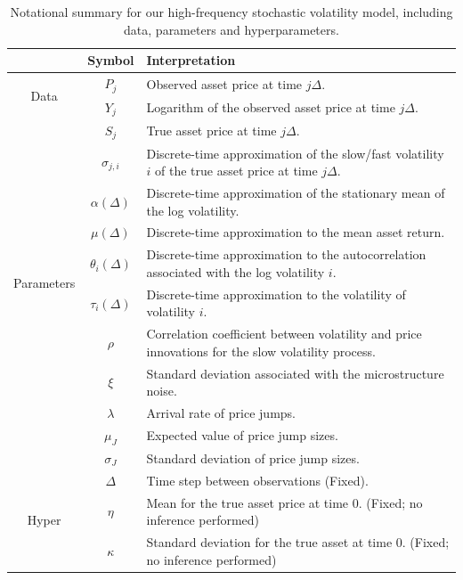 \documentclass[10pt]{article}
\begin{document}
\begin{table}[h!]
\begin{center}
\begin{tabular}{c|c|p{10cm}}
&  Symbol   &   Interpretation  \\ \hline \hline
\multirow{2}{*}{\begin{sideways} Data \end{sideways}} &  $P_j$   &   Observed asset price at time $j\Delta$.  \\
&  $Y_j$   &   Logarithm of the observed asset price at time $j\Delta$.  \\ \hline
\multirow{10}{*}{\begin{sideways} Parameters \end{sideways}} &  $S_j$   &   True asset price at time $j\Delta$.  \\
&  $\sigma_{j,i}$   &   Discrete-time approximation of the slow/fast volatility $i$ of the true asset price at time $j\Delta$.  \\
&  $\alpha(\Delta)$   &   Discrete-time approximation of the stationary mean of the log volatility.  \\
&  $\mu(\Delta)$   &  Discrete-time approximation to the mean asset return.  \\
&  $\theta_i(\Delta)$   &  Discrete-time approximation to the autocorrelation associated with the log volatility $i$.  \\
&  $\tau_i(\Delta)$   &  Discrete-time approximation to the volatility of volatility $i$.  \\
&  $\rho$   &  Correlation coefficient between volatility and price innovations for the slow volatility process.  \\
  &  $\xi$     &   Standard deviation associated with the microstructure noise.  \\
  & $\lambda$ & Arrival rate of price jumps. \\
  & $\mu_J$ & Expected value of price jump sizes. \\
  & $\sigma_J$ & Standard deviation of price jump sizes. \\ \hline
\multirow{4}{*}{\begin{sideways} Hyper \end{sideways}} &  $\Delta$   &  Time step between observations (Fixed).  \\
&  $\eta$   &  Mean for the true asset price at time 0. (Fixed; no inference performed)  \\
&  $\kappa$   &  Standard deviation for the true asset at time 0. (Fixed; no inference performed) \\
\end{tabular}
\caption{Notational summary for our high-frequency stochastic volatility model, including data, parameters and hyperparameters.}\label{ta:parameters}
\end{center}
\end{table}
\end{document}
